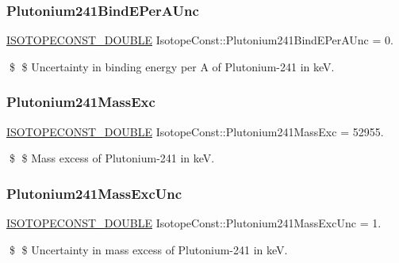 \subsubsection{\texorpdfstring{Plutonium241\+Bind\+E\+Per\+A\+Unc}{Plutonium241BindEPerAUnc}}
{\footnotesize\ttfamily \mbox{\hyperlink{group___isotope_const-_macros_ga8f45a7272ce02c0b4c65c44636ed719a}{I\+S\+O\+T\+O\+P\+E\+C\+O\+N\+S\+T\+\_\+\+D\+O\+U\+B\+LE}} Isotope\+Const\+::\+Plutonium241\+Bind\+E\+Per\+A\+Unc = 0.}

\$ \$ Uncertainty in binding energy per A of Plutonium-\/241 in keV. \mbox{\label{group___isotope_const-_plutonium-_pu241_gaf0882dec94199502b1de0268f6112b46}} 
\subsubsection{\texorpdfstring{Plutonium241\+Mass\+Exc}{Plutonium241MassExc}}
{\footnotesize\ttfamily \mbox{\hyperlink{group___isotope_const-_macros_ga8f45a7272ce02c0b4c65c44636ed719a}{I\+S\+O\+T\+O\+P\+E\+C\+O\+N\+S\+T\+\_\+\+D\+O\+U\+B\+LE}} Isotope\+Const\+::\+Plutonium241\+Mass\+Exc = 52955.}

\$ \$ Mass excess of Plutonium-\/241 in keV. \mbox{\label{group___isotope_const-_plutonium-_pu241_gae9fbe7c68adfda559a1932a2ec3788ee}} 
\subsubsection{\texorpdfstring{Plutonium241\+Mass\+Exc\+Unc}{Plutonium241MassExcUnc}}
{\footnotesize\ttfamily \mbox{\hyperlink{group___isotope_const-_macros_ga8f45a7272ce02c0b4c65c44636ed719a}{I\+S\+O\+T\+O\+P\+E\+C\+O\+N\+S\+T\+\_\+\+D\+O\+U\+B\+LE}} Isotope\+Const\+::\+Plutonium241\+Mass\+Exc\+Unc = 1.}

\$ \$ Uncertainty in mass excess of Plutonium-\/241 in keV. \mbox{\label{group___isotope_const-_plutonium-_pu241_gacb266b6a2edfa73aa4273e365d7c1e59}} 
